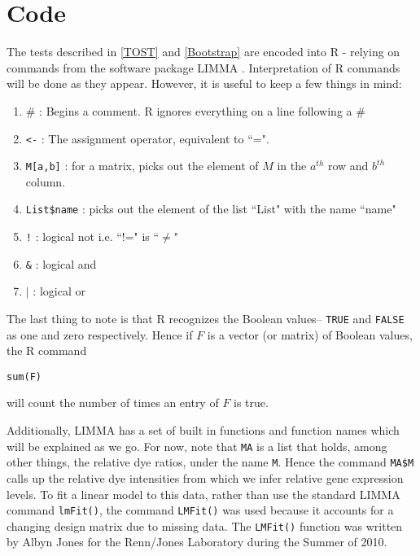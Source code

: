 \chapter{Code}
\label{Code}
The tests described in \ref{TOST} and \ref{Bootstrap} are encoded into R \cite{R} - relying on commands from the software package LIMMA \cite{LIMMA}. Interpretation of R commands will be done as they appear. However, it is useful to keep a few things in mind:
\begin{enumerate}
\item \# : Begins a comment. R ignores everything on a line following a \#
\item \texttt{<-} : The assignment operator, equivalent to ``=".
\item \texttt{M[a,b]} : for a matrix, picks out the element of $M$ in the $a^{th}$ row and $b^{th}$ column.
\item \texttt{List\$name} : picks out the element of the list ``List" with the name ``name"
\item \texttt{!} : logical not i.e. ``!=" is ``$\neq$"
\item \texttt{\&} : logical and
\item \texttt{$|$} : logical or
\end{enumerate}

The last thing to note is that R recognizes the Boolean values-- \texttt{TRUE} and \texttt{FALSE} as one and zero respectively. Hence if  $F$ is a vector (or matrix) of Boolean values, the R command 
\begin{center}
\begin{verbatim}
sum(F)
\end{verbatim}
\end{center}
will count the number of times an entry of $F$ is true.

Additionally, LIMMA has a set of built in functions and function names which will be explained as we go. For now, note that \texttt{MA} is a list that holds, among other things, the relative dye ratios, under the name \texttt{M}. Hence the command \texttt{MA\$M} calls up the relative dye intensities from which we infer relative gene expression levels. To fit a linear model to this data, rather than use the standard LIMMA command \texttt{lmFit()}, the command \texttt{LMFit()} was used because it accounts for a changing design matrix due to missing data. The \texttt{LMFit()} function was written by Albyn Jones for the Renn/Jones Laboratory during the Summer of 2010. 

